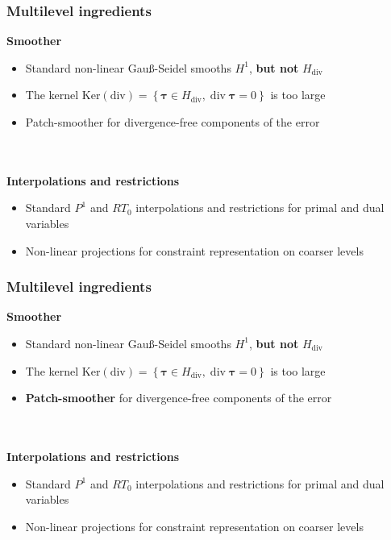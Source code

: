 \documentclass[8pt, oneside]{beamer}   	%
\newcommand{\tdiv}{\operatorname{div}}
\newcommand{\btau}{\boldsymbol{\tau}}
\newcommand{\colo}{\color{orange}}
\newcommand{\colk}{\color{black}}
\newcommand{\titlecolor}[1]{\frametitle{\textcolor{dkgrey}{ \textbf{#1}}}}
\begin{document}
\begin{frame}
\titlecolor{Multilevel ingredients}
\textbf{Smoother}
\begin{itemize}
\item Standard non-linear Gau{\ss}-Seidel smooths $H^1$, \textbf{but not} $H_{\text{div}}$ 
\item The kernel $\text{Ker}(\text{div})=  \left\lbrace \btau \in H_{\text{div}}, \tdiv \btau =0   \right\rbrace $ is too large
\item  Patch-smoother \colk for divergence-free components of the error
\end{itemize}
${}$\\${}$\\
\textbf{Interpolations and restrictions}
\begin{itemize}
\item  Standard $P^1$ and $RT_0$ interpolations and restrictions for primal and dual variables
\item Non-linear projections for  constraint representation on coarser levels \colk
\end{itemize}
\end{frame}

\begin{frame}
\titlecolor{Multilevel ingredients}
\textbf{Smoother}
\begin{itemize}
\item Standard non-linear Gau{\ss}-Seidel smooths $H^1$, \textbf{but not} $H_{\text{div}}$ 
\item The kernel $\text{Ker}(\text{div})=  \left\lbrace \btau \in H_{\text{div}}, \tdiv \btau =0   \right\rbrace $ is too large
\item \colo \textbf{Patch-smoother} \colk for divergence-free components of the error
\end{itemize}
${}$\\${}$\\
\textbf{Interpolations and restrictions}
\begin{itemize}
\item  Standard $P^1$ and $RT_0$ interpolations and restrictions for primal and dual variables
\item Non-linear projections for constraint representation on coarser levels \colk
\end{itemize}
\end{frame}






\end{document}
